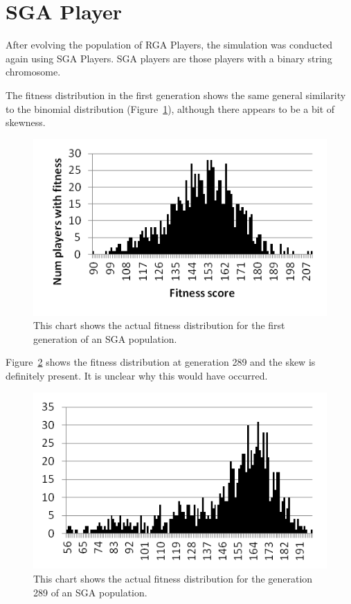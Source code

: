 \section{SGA Player}

After evolving the population of RGA Players, the simulation was conducted again
using SGA Players. SGA players are those players with a binary string
chromosome.

The fitness distribution in the first generation shows the same general
similarity to the binomial distribution (Figure~\ref{figure-sga_gen0}), although
there appears to be a bit of skewness.

\begin{figure}[htp]
\centerline{\includegraphics[width=0.75\columnwidth]{Figures/sga_gen0.png}}
\caption[SGA Fitness Generation 0]{This chart shows the actual fitness
distribution for the first generation of an SGA population.}
\label{figure-sga_gen0}
\end{figure}

Figure~\ref{figure-sga_gen289} shows the fitness distribution at generation 289
and the skew is definitely present. It is unclear why this would have occurred.

\begin{figure}[htp]
\centerline{\includegraphics[width=0.75\columnwidth]{Figures/sga_gen289.png}}
\caption[SGA Fitness Generation 289]{This chart shows the actual fitness
distribution for the generation 289 of an SGA population.}
\label{figure-sga_gen289}
\end{figure}

